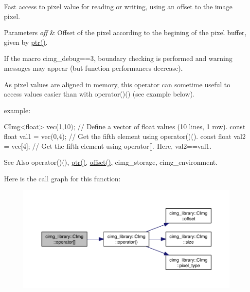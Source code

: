 Fast access to pixel value for reading or writing, using an offset to the image pixel. 


\begin{DoxyParams}{Parameters}
{\em off} & Offset of the pixel according to the begining of the pixel buffer, given by \hyperlink{structcimg__library_1_1_c_img_af19c37d44b9fce37ad7c4a9ad247d1a0}{ptr()}.\\
\hline
\end{DoxyParams}

\begin{DoxyItemize}
\item If the macro {\ttfamily cimg\-\_\-debug==3}, boundary checking is performed and warning messages may appear (but function performances decrease).
\item As pixel values are aligned in memory, this operator can sometime useful to access values easier than with operator()() (see example below).
\end{DoxyItemize}

\begin{DoxyParagraph}{example\-:}

\begin{DoxyCode}
CImg<float> vec(1,10);        \textcolor{comment}{// Define a vector of float values (10 lines, 1 row).}
\textcolor{keyword}{const} \textcolor{keywordtype}{float} val1 = vec(0,4);  \textcolor{comment}{// Get the fifth element using operator()().}
\textcolor{keyword}{const} \textcolor{keywordtype}{float} val2 = vec[4];    \textcolor{comment}{// Get the fifth element using operator[]. Here, val2==val1.}
\end{DoxyCode}

\end{DoxyParagraph}
\begin{DoxySeeAlso}{See Also}
operator()(), \hyperlink{structcimg__library_1_1_c_img_af19c37d44b9fce37ad7c4a9ad247d1a0}{ptr()}, \hyperlink{structcimg__library_1_1_c_img_a266ad9e6e5d13058af75966b7d7e3ad9}{offset()}, cimg\-\_\-storage, cimg\-\_\-environment. 
\end{DoxySeeAlso}


Here is the call graph for this function\-:
\nopagebreak
\begin{figure}[H]
\begin{center}
\leavevmode
\includegraphics[width=350pt]{structcimg__library_1_1_c_img_a53ee85b82244ff16acd428e5ad655540_cgraph}
\end{center}
\end{figure}


